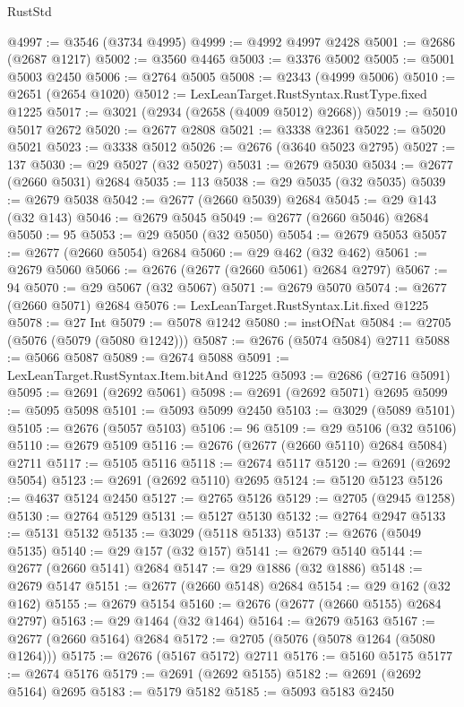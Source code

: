\begin{lexlean}{RustStd}
\begin{coremodule}
{\begin{coremodule}
{{{{{{{{{{{{{{{{{{{{{{{{{{{{{{{{{{{{{{{{{{{{{{{{{{{{{{{@4997 := @3546 (@3734 @4995)
@4999 := @4992 @4997 @2428
@5001 := @2686 (@2687 @1217)
@5002 := @3560 @4465
@5003 := @3376 @5002
@5005 := @5001 @5003 @2450
@5006 := @2764 @5005
@5008 := @2343 (@4999 @5006)
@5010 := @2651 (@2654 @1020)
@5012 := LexLeanTarget.RustSyntax.RustType.fixed @1225
@5017 := @3021 (@2934 (@2658 (@4009 @5012) @2668))
@5019 := @5010 @5017 @2672
@5020 := @2677 @2808
@5021 := @3338 @2361
@5022 := @5020 @5021
@5023 := @3338 @5012
@5026 := @2676 (@3640 @5023 @2795)
@5027 := 137
@5030 := @29 @5027 (@32 @5027)
@5031 := @2679 @5030
@5034 := @2677 (@2660 @5031) @2684
@5035 := 113
@5038 := @29 @5035 (@32 @5035)
@5039 := @2679 @5038
@5042 := @2677 (@2660 @5039) @2684
@5045 := @29 @143 (@32 @143)
@5046 := @2679 @5045
@5049 := @2677 (@2660 @5046) @2684
@5050 := 95
@5053 := @29 @5050 (@32 @5050)
@5054 := @2679 @5053
@5057 := @2677 (@2660 @5054) @2684
@5060 := @29 @462 (@32 @462)
@5061 := @2679 @5060
@5066 := @2676 (@2677 (@2660 @5061) @2684 @2797)
@5067 := 94
@5070 := @29 @5067 (@32 @5067)
@5071 := @2679 @5070
@5074 := @2677 (@2660 @5071) @2684
@5076 := LexLeanTarget.RustSyntax.Lit.fixed @1225
@5078 := @27 Int
@5079 := @5078 @1242
@5080 := instOfNat
@5084 := @2705 (@5076 (@5079 (@5080 @1242)))
@5087 := @2676 (@5074 @5084) @2711
@5088 := @5066 @5087
@5089 := @2674 @5088
@5091 := LexLeanTarget.RustSyntax.Item.bitAnd @1225
@5093 := @2686 (@2716 @5091)
@5095 := @2691 (@2692 @5061)
@5098 := @2691 (@2692 @5071) @2695
@5099 := @5095 @5098
@5101 := @5093 @5099 @2450
@5103 := @3029 (@5089 @5101)
@5105 := @2676 (@5057 @5103)
@5106 := 96
@5109 := @29 @5106 (@32 @5106)
@5110 := @2679 @5109
@5116 := @2676 (@2677 (@2660 @5110) @2684 @5084) @2711
@5117 := @5105 @5116
@5118 := @2674 @5117
@5120 := @2691 (@2692 @5054)
@5123 := @2691 (@2692 @5110) @2695
@5124 := @5120 @5123
@5126 := @4637 @5124 @2450
@5127 := @2765 @5126
@5129 := @2705 (@2945 @1258)
@5130 := @2764 @5129
@5131 := @5127 @5130
@5132 := @2764 @2947
@5133 := @5131 @5132
@5135 := @3029 (@5118 @5133)
@5137 := @2676 (@5049 @5135)
@5140 := @29 @157 (@32 @157)
@5141 := @2679 @5140
@5144 := @2677 (@2660 @5141) @2684
@5147 := @29 @1886 (@32 @1886)
@5148 := @2679 @5147
@5151 := @2677 (@2660 @5148) @2684
@5154 := @29 @162 (@32 @162)
@5155 := @2679 @5154
@5160 := @2676 (@2677 (@2660 @5155) @2684 @2797)
@5163 := @29 @1464 (@32 @1464)
@5164 := @2679 @5163
@5167 := @2677 (@2660 @5164) @2684
@5172 := @2705 (@5076 (@5078 @1264 (@5080 @1264)))
@5175 := @2676 (@5167 @5172) @2711
@5176 := @5160 @5175
@5177 := @2674 @5176
@5179 := @2691 (@2692 @5155)
@5182 := @2691 (@2692 @5164) @2695
@5183 := @5179 @5182
@5185 := @5093 @5183 @2450
}}}}}}}}}}}}}}}}}}}}}}}}}}}}}}}}}}}}}}}}}}}}}}}}}}}}}}}
\end{coremodule}}
\end{coremodule}
\end{lexlean}
